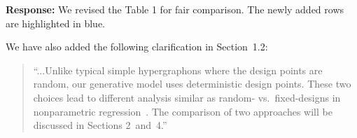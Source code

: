 \documentclass[11pt]{article}
\theoremstyle{plain}
\theoremstyle{definition}
\begin{document}
\begin{enumerate}[wide, labelwidth=!, labelindent=0pt]
    \textbf{Response:}
       We revised the Table 1 for fair comparison. The newly added rows are highlighted in blue. 
   \begin{quote}
   \begin{table}[h]
    \centering
    \caption{\color{blue}Comparison of our results with previous work...}
\end{table}
     \end{quote}
     
     \vspace{-1cm}
   We have also added the following clarification in Section~1.2:    
   \begin{quote}
   \color{blue}``...Unlike typical simple hypergraphons where the design points are random, our generative model uses deterministic design points. These two choices lead to different analysis similar as random- vs.\ fixed-designs in nonparametric regression~\citep{wasserman2006all,tsybakov2009introduction}. The comparison of two approaches will be discussed in Sections 2~and~4.''
   \end{quote}
   

\end{enumerate}
\end{document}
